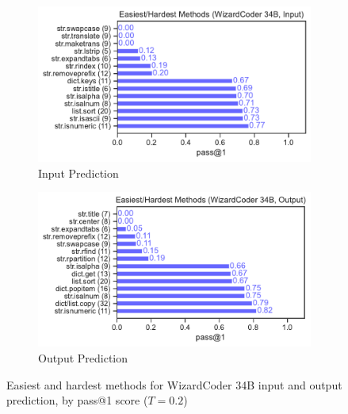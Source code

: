 \begin{figure}[H]
    \centering
    \begin{subfigure}[b]{0.49\textwidth}
        \includegraphics[width=\textwidth]{figs/benchmark/dataset_difficult_methods_wizardcoder_input.pdf}
        \caption{Input Prediction}
    \end{subfigure}
    \begin{subfigure}[b]{0.49\textwidth}
        \includegraphics[width=\textwidth]{figs/benchmark/dataset_difficult_methods_wizardcoder_output.pdf}
        \caption{Output Prediction}
    \end{subfigure}
    \caption{Easiest and hardest methods for WizardCoder 34B input and output prediction, by pass@1 score ($T=0.2$)}
    \label{fig:dataset-difficult-wizardcoder}
\end{figure}

